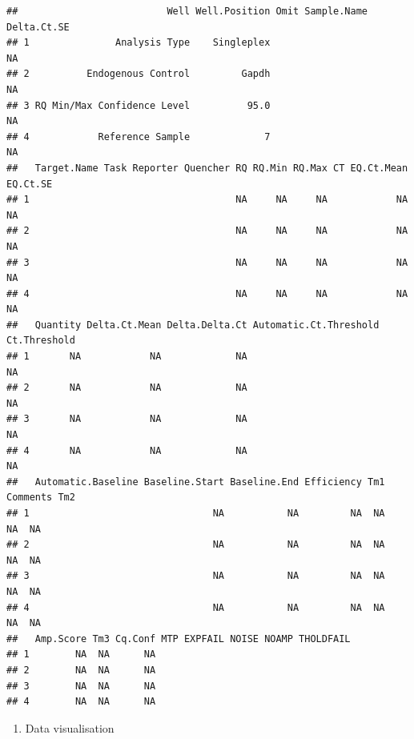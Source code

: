 \documentclass[
]{book}
\newenvironment{Shaded}{\begin{snugshade}}{\end{snugshade}}
\newcommand{\AttributeTok}[1]{\textcolor[rgb]{0.77,0.63,0.00}{#1}}
\newcommand{\CommentTok}[1]{\textcolor[rgb]{0.56,0.35,0.01}{\textit{#1}}}
\newcommand{\ConstantTok}[1]{\textcolor[rgb]{0.00,0.00,0.00}{#1}}
\newcommand{\FunctionTok}[1]{\textcolor[rgb]{0.00,0.00,0.00}{#1}}
\newcommand{\NormalTok}[1]{#1}
\newcommand{\SpecialCharTok}[1]{\textcolor[rgb]{0.00,0.00,0.00}{#1}}
\providecommand{\tightlist}{%
  \setlength{\itemsep}{0pt}\setlength{\parskip}{0pt}}
\begin{document}
\begin{verbatim}
##                          Well Well.Position Omit Sample.Name Delta.Ct.SE
## 1               Analysis Type    Singleplex                           NA
## 2          Endogenous Control         Gapdh                           NA
## 3 RQ Min/Max Confidence Level          95.0                           NA
## 4            Reference Sample             7                           NA
##   Target.Name Task Reporter Quencher RQ RQ.Min RQ.Max CT EQ.Ct.Mean EQ.Ct.SE
## 1                                    NA     NA     NA            NA       NA
## 2                                    NA     NA     NA            NA       NA
## 3                                    NA     NA     NA            NA       NA
## 4                                    NA     NA     NA            NA       NA
##   Quantity Delta.Ct.Mean Delta.Delta.Ct Automatic.Ct.Threshold Ct.Threshold
## 1       NA            NA             NA                                  NA
## 2       NA            NA             NA                                  NA
## 3       NA            NA             NA                                  NA
## 4       NA            NA             NA                                  NA
##   Automatic.Baseline Baseline.Start Baseline.End Efficiency Tm1 Comments Tm2
## 1                                NA           NA         NA  NA       NA  NA
## 2                                NA           NA         NA  NA       NA  NA
## 3                                NA           NA         NA  NA       NA  NA
## 4                                NA           NA         NA  NA       NA  NA
##   Amp.Score Tm3 Cq.Conf MTP EXPFAIL NOISE NOAMP THOLDFAIL
## 1        NA  NA      NA                                  
## 2        NA  NA      NA                                  
## 3        NA  NA      NA                                  
## 4        NA  NA      NA
\end{verbatim}

\begin{enumerate}
\def\labelenumi{\arabic{enumi}.}
\setcounter{enumi}{3}
\tightlist
\item
  Data visualisation
\end{enumerate}

\begin{Shaded}
\end{Shaded}
\end{document}
